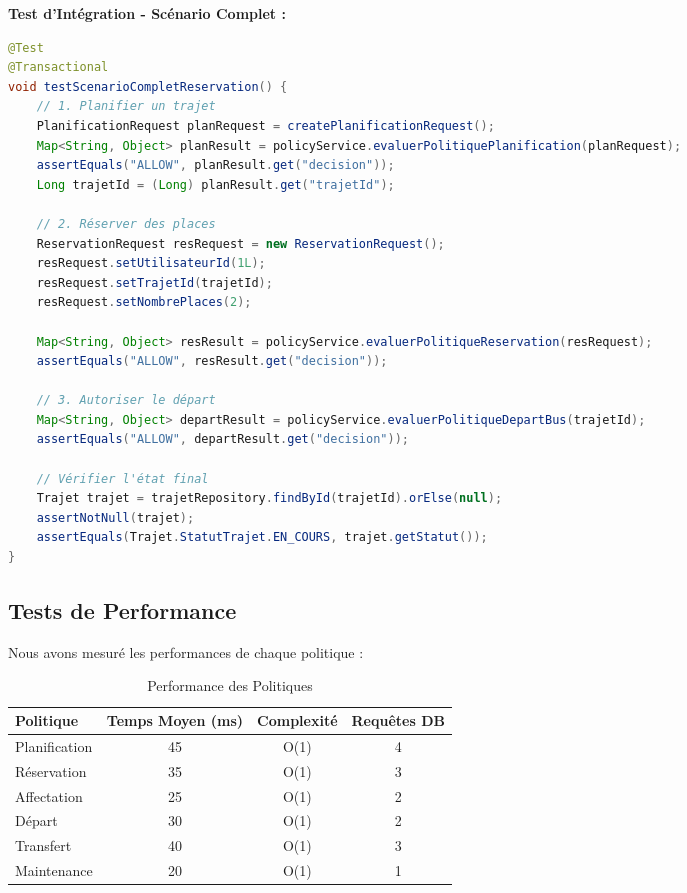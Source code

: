 \documentclass[12pt,a4paper]{article}
\begin{document}
    \begin{codebox}
        \textbf{Test d'Intégration - Scénario Complet :}
        \begin{lstlisting}[language=Java]
@Test
@Transactional
void testScenarioCompletReservation() {
    // 1. Planifier un trajet
    PlanificationRequest planRequest = createPlanificationRequest();
    Map<String, Object> planResult = policyService.evaluerPolitiquePlanification(planRequest);
    assertEquals("ALLOW", planResult.get("decision"));
    Long trajetId = (Long) planResult.get("trajetId");

    // 2. Réserver des places
    ReservationRequest resRequest = new ReservationRequest();
    resRequest.setUtilisateurId(1L);
    resRequest.setTrajetId(trajetId);
    resRequest.setNombrePlaces(2);

    Map<String, Object> resResult = policyService.evaluerPolitiqueReservation(resRequest);
    assertEquals("ALLOW", resResult.get("decision"));

    // 3. Autoriser le départ
    Map<String, Object> departResult = policyService.evaluerPolitiqueDepartBus(trajetId);
    assertEquals("ALLOW", departResult.get("decision"));

    // Vérifier l'état final
    Trajet trajet = trajetRepository.findById(trajetId).orElse(null);
    assertNotNull(trajet);
    assertEquals(Trajet.StatutTrajet.EN_COURS, trajet.getStatut());
}
        \end{lstlisting}
    \end{codebox}

    \subsection{Tests de Performance}

    Nous avons mesuré les performances de chaque politique :

    \begin{table}[H]
        \centering
        \begin{tabular}{|l|c|c|c|}
            \hline
            \textbf{Politique} & \textbf{Temps Moyen (ms)} & \textbf{Complexité} & \textbf{Requêtes DB} \\
            \hline
            Planification & 45 & O(1) & 4 \\
            Réservation & 35 & O(1) & 3 \\
            Affectation & 25 & O(1) & 2 \\
            Départ & 30 & O(1) & 2 \\
            Transfert & 40 & O(1) & 3 \\
            Maintenance & 20 & O(1) & 1 \\
            \hline
        \end{tabular}
        \caption{Performance des Politiques}
    \end{table}
\end{document}
